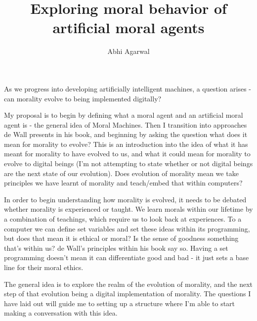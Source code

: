 \documentclass[11pt, oneside]{article}
\title{Exploring moral behavior of artificial moral agents}
\author{Abhi Agarwal}
\date{}
\begin{document}
\maketitle

\par As we progress into developing artificially intelligent machines, a question arises - can morality evolve to being implemented digitally? 
\par My proposal is to begin by defining what a moral agent and an artificial moral agent is - the general idea of Moral Machines. Then I transition into approaches de Wall presents in his book, and beginning by asking the question what does it mean for morality to evolve? This is an introduction into the idea of what it has meant for morality to have evolved to us, and what it could mean for morality to evolve to digital beings (I'm not attempting to state whether or not digital beings are the next state of our evolution). Does evolution of morality mean we take principles we have learnt of morality and teach/embed that within computers?

\par In order to begin understanding how morality is evolved, it needs to be debated whether morality is experienced or taught. We learn morals within our lifetime by a combination of teachings, which require us to look back at experiences. To a computer we can define set variables and set these ideas within its programming, but does that mean it is ethical or moral? Is the sense of goodness something that's within us? de Wall's principles within his book say so. Having a set programming doesn't mean it can differentiate good and bad - it just sets a base line for their moral ethics. 

\par The general idea is to explore the realm of the evolution of morality, and the next step of that evolution being a digital implementation of morality. The questions I have laid out will guide me to setting up a structure where I'm able to start making a conversation with this idea. 
\end{document}
